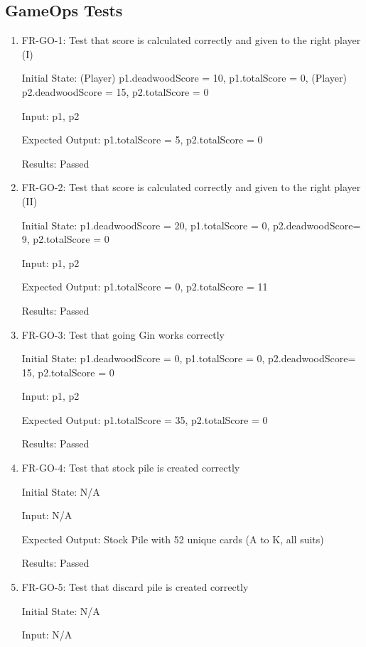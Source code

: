 \documentclass[12pt, titlepage]{article}
\begin{document}
\subsection{GameOps Tests}
\begin{enumerate}
    \item FR-GO-1: Test that score is calculated correctly and given to the right player (I)
    
    Initial State: (Player) p1.deadwoodScore = 10, p1.totalScore = 0, (Player) p2.deadwoodScore = 15, p2.totalScore = 0

    Input: p1, p2

    Expected Output: p1.totalScore = 5, p2.totalScore = 0

    Results: Passed
    
    \item FR-GO-2: Test that score is calculated correctly and given to the right player (II)
    
    Initial State: p1.deadwoodScore = 20, p1.totalScore = 0, p2.deadwoodScore= 9, p2.totalScore = 0
    
    Input: p1, p2
    
    Expected Output: p1.totalScore = 0, p2.totalScore = 11

    Results: Passed
    
    \item FR-GO-3: Test that going Gin works correctly
    
    Initial State: p1.deadwoodScore = 0, p1.totalScore = 0, p2.deadwoodScore= 15, p2.totalScore = 0
    
    Input: p1, p2
    
    Expected Output: p1.totalScore = 35, p2.totalScore = 0
    
    Results: Passed

    \item FR-GO-4: Test that stock pile is created correctly
    
    Initial State: N/A
    
    Input: N/A
    
    Expected Output: Stock Pile with 52 unique cards (A to K, all suits)

    Results: Passed
    
    \item FR-GO-5: Test that discard pile is created correctly
    
    Initial State: N/A
    
    Input: N/A
    

\end{enumerate}
\end{document}
